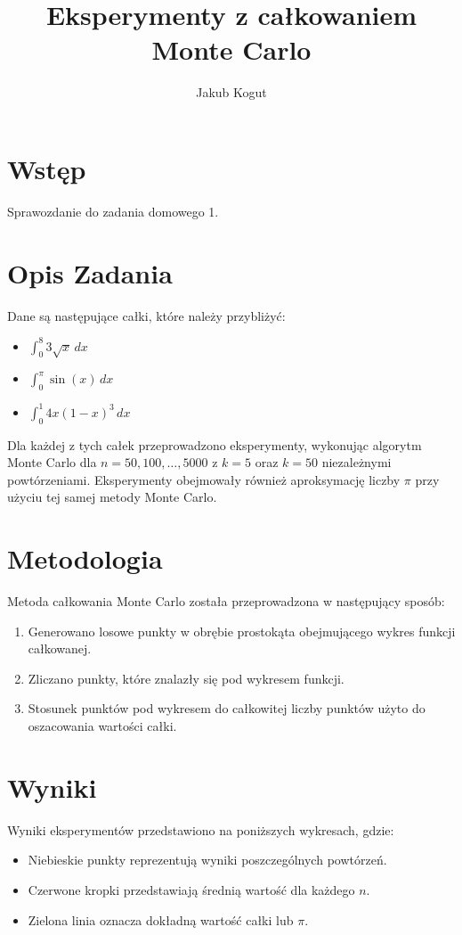 \documentclass{article}
\title{Eksperymenty z całkowaniem Monte Carlo}
\author{Jakub Kogut}
\date{}
\begin{document}
\maketitle

\section{Wstęp}
Sprawozdanie do zadania domowego 1.

\section{Opis Zadania}
Dane są następujące całki, które należy przybliżyć:
\begin{itemize}
    \item \( \int_{0}^{8} 3 \sqrt{x} \, dx \)
    \item \( \int_{0}^{\pi} \sin(x) \, dx \)
    \item \( \int_{0}^{1} 4x(1 - x)^3 \, dx \)
\end{itemize}

Dla każdej z tych całek przeprowadzono eksperymenty, wykonując algorytm Monte Carlo dla \( n = 50, 100, \ldots, 5000 \) z \( k = 5 \) oraz \( k = 50 \) niezależnymi powtórzeniami. Eksperymenty obejmowały również aproksymację liczby \(\pi\) przy użyciu tej samej metody Monte Carlo.

\section{Metodologia}
Metoda całkowania Monte Carlo została przeprowadzona w następujący sposób:
\begin{enumerate}
    \item Generowano losowe punkty w obrębie prostokąta obejmującego wykres funkcji całkowanej.
    \item Zliczano punkty, które znalazły się pod wykresem funkcji.
    \item Stosunek punktów pod wykresem do całkowitej liczby punktów użyto do oszacowania wartości całki.
\end{enumerate}

\section{Wyniki}
Wyniki eksperymentów przedstawiono na poniższych wykresach, gdzie:
\begin{itemize}
    \item Niebieskie punkty reprezentują wyniki poszczególnych powtórzeń.
    \item Czerwone kropki przedstawiają średnią wartość dla każdego \( n \).
    \item Zielona linia oznacza dokładną wartość całki lub \(\pi\).
\end{itemize}
\end{document}
